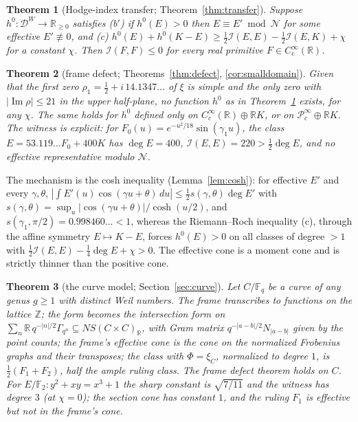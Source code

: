 \documentclass[11pt]{amsart}
\newtheorem{mainthm}{Theorem}
\theoremstyle{definition}
\theoremstyle{remark}
\newcommand{\R}{\mathbb R}
\newcommand{\Z}{\mathbb Z}
\newcommand{\F}{\mathbb F}
\newcommand{\Iml}{\operatorname{Im}}
\newcommand{\DW}{\mathcal D^{W}}
\newcommand{\Nr}{\mathcal N}
\newcommand{\I}{\mathcal I}
\newcommand{\dg}{\deg}
\begin{document}
\begin{mainthm}[Hodge-index transfer; Theorem~\ref{thm:transfer}]\label{thmB}
Suppose $h^0:\DW\to\R_{\ge0}$ satisfies \textup{(b$'$)} if $h^0(E)>0$ then $E\equiv E'\bmod\Nr$
for some effective $E'\not\equiv0$, and \textup{(c)} $h^0(E)+h^0(K-E)\ge\frac12\I(E,E)-\frac12\I(E,K)+\chi$
for a constant $\chi$. Then $\I(F,F)\le0$ for every real primitive $F\in C_c^\infty(\R)$.
\end{mainthm}

\begin{mainthm}[frame defect; Theorems~\ref{thm:defect}, \ref{cor:smalldomain}]\label{thmC}
Given that the first zero $\rho_1=\frac12+i\,14.1347\ldots$ of $\xi$ is simple and the only zero
with $|\Iml\rho|\le21$ in the upper half-plane, no function $h^0$ as in Theorem~\ref{thmB} exists,
for any $\chi$. The same holds for $h^0$ defined only on $C_c^\infty(\R)\oplus\R K$, or on
$\mathcal P^\infty_c\oplus\R K$. The witness is explicit: for
$F_0(u)=e^{-u^2/18}\sin(\gamma_1u)$, the class $E=53.119\ldots F_0+400K$ has $\dg E=400$,
$\I(E,E)=220>\frac12\dg E$, and no effective representative modulo $\Nr$.
\end{mainthm}

The mechanism is the cosh inequality (Lemma~\ref{lem:cosh}): for effective $E'$ and every $\gamma,\theta$,
$|\int E'(u)\cos(\gamma u+\theta)\,du|\le\frac12s(\gamma,\theta)\dg E'$ with
$s(\gamma,\theta)=\sup_u|\cos(\gamma u+\theta)|/\cosh(u/2)$, and $s(\gamma_1,\pi/2)=0.998460\ldots<1$,
whereas the Riemann--Roch inequality (c), through the affine symmetry $E\mapsto K-E$, forces
$h^0(E)>0$ on all classes of degree $>1$ with $\frac12\I(E,E)-\frac14\dg E+\chi>0$. The effective cone
is a moment cone and is strictly thinner than the positive cone.

\begin{mainthm}[the curve model; Section~\ref{sec:curve}]\label{thmD}
Let $C/\F_q$ be a curve of any genus $g\ge1$ with distinct Weil numbers. The frame transcribes to functions
on the lattice $\Z$; the form becomes the intersection form on $\sum_n\R\,q^{-|n|/2}\Gamma_{q^n}\subseteq
NS(C\times C)_\R$, with Gram matrix $q^{-|a-b|/2}N_{|a-b|}$ given by the point counts; the frame's
effective cone is the cone on the normalized Frobenius graphs and their transposes; the class with
$\Phi=\xi_C$, normalized to degree $1$, is $\frac12(F_1+F_2)$, half the ample ruling class. The frame
defect theorem holds on $C$. For $E/\F_2:y^2+xy=x^3+1$ the sharp constant is $\sqrt{7/11}$ and the
witness has degree $3$ (at $\chi=0$); the section cone has constant $1$, and the ruling $F_1$ is effective but not
in the frame's cone.
\end{mainthm}
\end{document}
